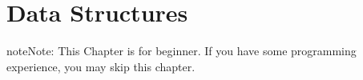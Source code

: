 \documentclass[letterpaper,12pt,english]{sphinxmanual}
\begin{document}

\begin{sphinxVerbatim}[commandchars=\\\{\}]

\end{sphinxVerbatim}


\begin{sphinxVerbatim}[commandchars=\\\{\}]

\end{sphinxVerbatim}


\begin{sphinxVerbatim}[commandchars=\\\{\}]

\end{sphinxVerbatim}


\begin{sphinxVerbatim}[commandchars=\\\{\}]

\end{sphinxVerbatim}


\begin{sphinxVerbatim}[commandchars=\\\{\}]

\end{sphinxVerbatim}


\begin{sphinxVerbatim}[commandchars=\\\{\}]

\end{sphinxVerbatim}


\chapter{Data Structures}
\label{\detokenize{struct:data-structures}}\label{\detokenize{struct:struct}}\label{\detokenize{struct::doc}}
\begin{sphinxadmonition}{note}{Note:}
This Chapter {\hyperref[\detokenize{struct:struct}]{}} is for beginner.  If you have some  programming experience, you may skip this chapter.
\end{sphinxadmonition}
\end{document}

